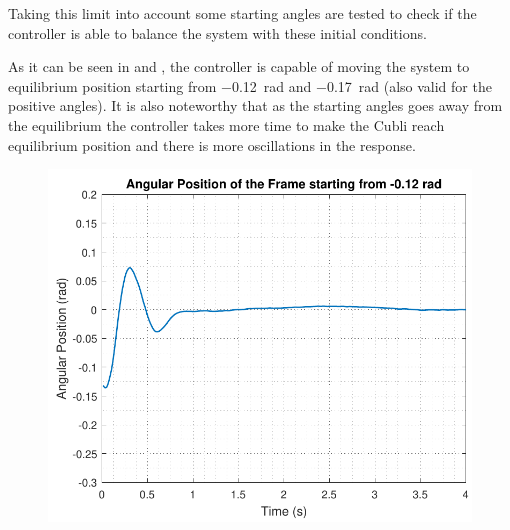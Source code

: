Taking this limit into account some starting angles are tested to check if the controller is able to balance the system with these initial conditions. 

As it can be seen in  and , the controller is capable of moving the system to equilibrium position starting from \SI{-0,12}{rad} and \SI{-0,17}{rad} (also valid for the positive angles). It is also noteworthy that as the starting angles goes away from the equilibrium the controller takes more time to make the Cubli reach equilibrium position and there is more oscillations in the response.

\begin{minipage}{\linewidth}
	\begin{minipage}{0.45\linewidth}
		\begin{figure}[H]
			\includegraphics[scale=.55]{figures/testCatch_12}
			\centering
			\captionsetup{justification=centering}
			\label{testCatch_12}
		\end{figure}
	\end{minipage}
	\hspace{0.03\linewidth}
	\begin{minipage}{0.45\linewidth}
		\begin{figure}[H]\vspace{-3mm}

\end{figure}
\end{minipage}
\end{minipage}
